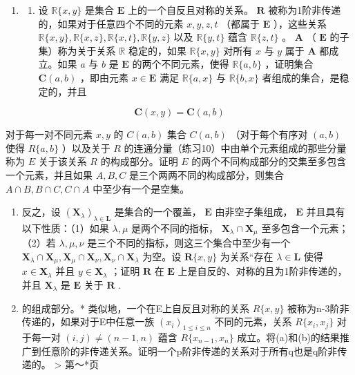 \begin{enumerate}
\def\labelenumi{\arabic{enumi}.}
\setcounter{enumi}{10}
\tightlist
\item
  \begin{enumerate}
  \def\labelenumii{(\alph{enumii})}
  \tightlist
  \item
    设 \(\mathbb{R}\{x, y\}\) 是集合 \(\mathbf{E}\) 上的一个自反且对称的关系。 \(\mathbf{R}\) 被称为1阶非传递的，如果对于任意四个不同的元素 \(x, y, z, t\) （都属于 \(\mathbf{E}\) ），这些关系 \(\mathbb{R}\{x, y\}, \mathbb{R}\{x, z\}, \mathbb{R}\{x, t\}, \mathbb{R}\{y, z\}\) 以及 \(\mathbb{R}\{y, t\}\) 蕴含 \(\mathbb{R}\{z, t\}\) 。 \(\mathbf{A}\) （ \(\mathbf{E}\) 的子集）称为关于关系 \(\mathbb{R}\) 稳定的，如果 \(\mathbb{R}\{x, y\}\) 对所有 \(x\) 与 \(y\) 属于 \(\mathbf{A}\) 都成立。如果 \(a\) 与 \(b\) 是 \(\mathbf{E}\) 的两个不同元素，使得 \(\mathbb{R}\{a, b\}\) ，证明集合 \(\mathbf{C}(a, b)\) ，即由元素 \(x \in \mathbf{E}\) 满足 \(\mathbb{R}\{a, x\}\) 与 \(\mathbb{R}\{b, x\}\) 者组成的集合，是稳定的，并且
  \end{enumerate}
\end{enumerate}

\[
\mathbf {C} (x, y) = \mathbf {C} (a, b)
\]

对于每一对不同元素 \(x, y\) 的 \(C(a, b)\) 集合 \(C(a, b)\) （对于每个有序对 \((a, b)\) 使得 \(R\{a, b\}\) ）以及关于 \(R\) 的连通分量（练习10）中由单个元素组成的那些分量称为 \(E\) 关于该关系 \(R\) 的构成部分。证明 \(E\) 的两个不同构成部分的交集至多包含一个元素，并且如果 \(A, B, C\) 是三个两两不同的构成部分，则集合 \(A \cap B, B \cap C, C \cap A\) 中至少有一个是空集。

\begin{enumerate}
\def\labelenumi{(\alph{enumi})}
\setcounter{enumi}{1}
\item
  反之，设 \((\mathbf{X}_{\lambda})_{\lambda \in \mathbf{L}}\) 是集合的一个覆盖， \(\mathbf{E}\) 由非空子集组成， \(\mathbf{E}\) 并且具有以下性质：（1）如果 \(\lambda, \mu\) 是两个不同的指标， \(\mathbf{X}_{\lambda} \cap \mathbf{X}_{\mu}\) 至多包含一个元素；（2）若 \(\lambda, \mu, \nu\) 是三个不同的指标，则这三个集合中至少有一个 \(\mathbf{X}_{\lambda} \cap \mathbf{X}_{\mu}, \mathbf{X}_{\mu} \cap \mathbf{X}_{\nu}, \mathbf{X}_{\nu} \cap \mathbf{X}_{\lambda}\) 为空。设 \(\mathbf{R}\{x, y\}\) 为关系“存在 \(\lambda \in \mathbf{L}\) 使得 \(x \in \mathbf{X}_{\lambda}\) 并且 \(y \in \mathbf{X}_{\lambda}\) ；证明 \(\mathbf{R}\) 在 \(\mathbf{E}\) 上是自反的、对称的且为1阶非传递的，并且 \(\mathbf{X}_{\lambda}\) 是 \(\mathbf{E}\) 关于 \(\mathbf{R}\) .
\item
  的组成部分。* 类似地，一个在E上自反且对称的关系 \(R\{x, y\}\) 被称为n-3阶非传递的，如果对于E中任意一族 \((x_{i})_{1 \leqslant i \leqslant n}\) 不同的元素，关系 \(R\{x_{i}, x_{j}\}\) 对于每一对 \((i, j) \neq (n-1, n)\) 蕴含 \(R\{x_{n-1}, x_{n}\}\) 成立。将(a)和(b)的结果推广到任意阶的非传递关系。证明一个p阶非传递的关系对于所有q也是q阶非传递的。 \textgreater{} 第～*页
\end{enumerate}
